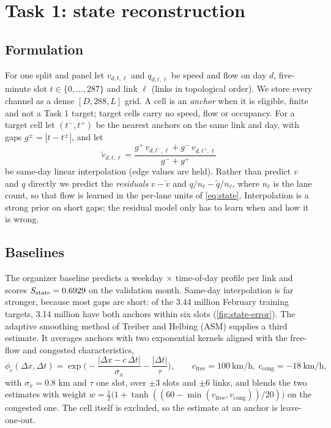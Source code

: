 \section{Task 1: state reconstruction}\label{sec:state}

\subsection{Formulation}
For one split and panel let $v_{d,t,\ell}$ and $q_{d,t,\ell}$ be speed and flow on day $d$, five-minute slot
$t\in\{0,\dots,287\}$ and link $\ell$ (links in topological order). We store every channel as a dense
$[D,288,L]$ grid. A cell is an \emph{anchor} when it is eligible, finite and not a Task 1 target; target cells
carry no speed, flow or occupancy. For a target cell let $(t^-,t^+)$ be the nearest anchors on the same link and
day, with gaps $g^\pm=|t-t^\pm|$, and let
\begin{equation}
  \tilde v_{d,t,\ell} = \frac{g^+\,v_{d,t^-,\ell} + g^-\,v_{d,t^+,\ell}}{g^-+g^+}
  \label{eq:interp}
\end{equation}
be same-day linear interpolation (edge values are held). Rather than predict $v$ and $q$ directly we predict the
\emph{residuals} $v-\tilde v$ and $q/n_\ell-\tilde q/n_\ell$, where $n_\ell$ is the lane count, so that flow is learned
in the per-lane units of \cref{eq:state}. Interpolation is a strong prior on short gaps; the residual model only
has to learn when and how it is wrong.

\subsection{Baselines}
The organizer baseline predicts a weekday $\times$ time-of-day profile per link and scores $S_{\mathrm{state}}=0.6929$ on the
validation month.
Same-day interpolation is far stronger, because most gaps are short: of the 3.44 million February training targets,
3.14 million have both anchors within six slots (\cref{fig:state-error}). The adaptive smoothing method of
Treiber and Helbing \cite{treiber2002} (ASM) supplies a third estimate. It averages anchors with two exponential
kernels aligned with the free-flow and congested characteristics,
\begin{equation}
  \phi_c(\Delta x,\Delta t) = \exp\!\Big(-\frac{|\Delta x - c\,\Delta t|}{\sigma_x}-\frac{|\Delta t|}{\tau}\Big),
  \qquad c_{\mathrm{free}}=100\ \mathrm{km/h},\ c_{\mathrm{cong}}=-18\ \mathrm{km/h},
  \label{eq:asm}
\end{equation}
with $\sigma_x=0.8$ km and $\tau$ one slot, over $\pm3$ slots and $\pm6$ links, and blends the two estimates with
weight $w=\tfrac12\big(1+\tanh((60-\min(v_{\mathrm{free}},v_{\mathrm{cong}}))/20)\big)$ on the congested one. The
cell itself is excluded, so the estimate at an anchor is leave-one-out.

